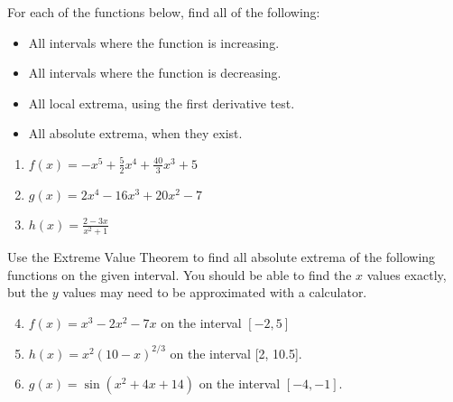 \documentclass{article}
\begin{document}
For each of the functions below, find all of the following:
\begin{itemize}
\item All intervals where the function is increasing.
\item All intervals where the function is decreasing.
\item All local extrema, using the first derivative test.
\item All absolute extrema, when they exist.
\end{itemize}
\begin{enumerate}
\item $f(x) = -x^5  + \frac{5}{2}x^4 + \frac{40
}{3}x^3 + 5$
\item $g(x) = 2x^4 -16x^3 + 20x^2 - 7$
\item $h(x) = \frac{2 - 3x}{x^2 + 1}$
\end{enumerate}

Use the Extreme Value Theorem to find all absolute extrema of the following functions on the given interval. You should be able to find the $x$ values exactly, but the $y$ values may need to be approximated with a calculator.

\begin{enumerate}
\setcounter{enumi}{3}
\item $f(x) = x^3 - 2x^2 -7x$ on the interval $[-2,5]$
\item $h(x) = x^2(10-x)^{2/3}$ on the interval [2, 10.5].
\item $g(x) = \sin(x^2 + 4x + 14)$ on the interval $[-4,-1]$.
\end{enumerate}
\end{document}
